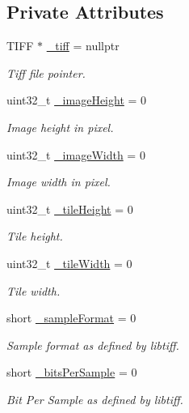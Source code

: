 \subsection*{Private Attributes}
\begin{DoxyCompactItemize}
\item 
T\+I\+FF $\ast$ \hyperlink{classfi_1_1GrayscaleTiffTileLoader_af0d6f3022e6ac29a09003ab4355140b8}{\+\_\+tiff} = nullptr
\begin{DoxyCompactList}\small\item\em Tiff file pointer. \end{DoxyCompactList}\item 
uint32\+\_\+t \hyperlink{classfi_1_1GrayscaleTiffTileLoader_a39968153f81f5cb790291f5f5da84c25}{\+\_\+image\+Height} = 0
\begin{DoxyCompactList}\small\item\em Image height in pixel. \end{DoxyCompactList}\item 
uint32\+\_\+t \hyperlink{classfi_1_1GrayscaleTiffTileLoader_ac4ed97a1e685ecbddeeba02dc27e2322}{\+\_\+image\+Width} = 0
\begin{DoxyCompactList}\small\item\em Image width in pixel. \end{DoxyCompactList}\item 
uint32\+\_\+t \hyperlink{classfi_1_1GrayscaleTiffTileLoader_a4b7991569a52e32f390217bfe3405cc8}{\+\_\+tile\+Height} = 0
\begin{DoxyCompactList}\small\item\em Tile height. \end{DoxyCompactList}\item 
uint32\+\_\+t \hyperlink{classfi_1_1GrayscaleTiffTileLoader_a2b0bd08e8488308b5f737bcf8ade57c8}{\+\_\+tile\+Width} = 0
\begin{DoxyCompactList}\small\item\em Tile width. \end{DoxyCompactList}\item 
short \hyperlink{classfi_1_1GrayscaleTiffTileLoader_abc25413b9994a9c62dc2fb4f19bf774e}{\+\_\+sample\+Format} = 0
\begin{DoxyCompactList}\small\item\em Sample format as defined by libtiff. \end{DoxyCompactList}\item 
short \hyperlink{classfi_1_1GrayscaleTiffTileLoader_a2c1f9f110d5ff19c064be417e381a7f6}{\+\_\+bits\+Per\+Sample} = 0
\begin{DoxyCompactList}\small\item\em Bit Per Sample as defined by libtiff. \end{DoxyCompactList}\end{DoxyCompactItemize}
